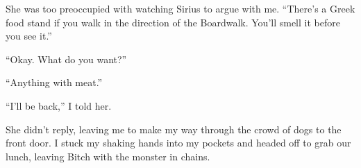 She was too preoccupied with watching Sirius to argue with me.  ``There's a Greek food stand if you walk in the direction of the Boardwalk.  You'll smell it before you see it.''



``Okay.  What do you want?''



``Anything with meat.''



``I'll be back,'' I told her.



She didn't reply, leaving me to make my way through the crowd of dogs to the front door.  I stuck my shaking hands into my pockets and headed off to grab our lunch, leaving Bitch with the monster in chains.





